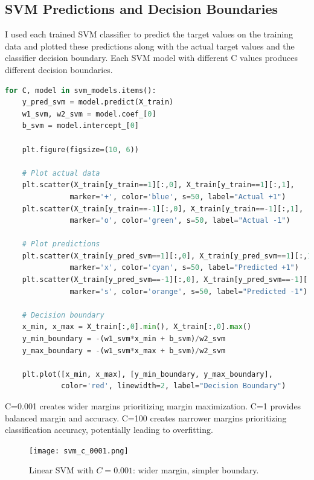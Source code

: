 \documentclass[12pt,a4paper]{article}
\begin{document}
\subsection{SVM Predictions and Decision Boundaries}

I used each trained SVM classifier to predict the target values on the training data and plotted these predictions along with the actual target values and the classifier decision boundary. Each SVM model with different C values produces different decision boundaries.

\begin{lstlisting}[language=Python, caption={SVM Predictions and Decision Boundaries}]
for C, model in svm_models.items():
    y_pred_svm = model.predict(X_train)
    w1_svm, w2_svm = model.coef_[0]
    b_svm = model.intercept_[0]
    
    plt.figure(figsize=(10, 6))
    
    # Plot actual data
    plt.scatter(X_train[y_train==1][:,0], X_train[y_train==1][:,1], 
               marker='+', color='blue', s=50, label="Actual +1")
    plt.scatter(X_train[y_train==-1][:,0], X_train[y_train==-1][:,1], 
               marker='o', color='green', s=50, label="Actual -1")
    
    # Plot predictions
    plt.scatter(X_train[y_pred_svm==1][:,0], X_train[y_pred_svm==1][:,1], 
               marker='x', color='cyan', s=50, label="Predicted +1")
    plt.scatter(X_train[y_pred_svm==-1][:,0], X_train[y_pred_svm==-1][:,1], 
               marker='s', color='orange', s=50, label="Predicted -1")
    
    # Decision boundary
    x_min, x_max = X_train[:,0].min(), X_train[:,0].max()
    y_min_boundary = -(w1_svm*x_min + b_svm)/w2_svm
    y_max_boundary = -(w1_svm*x_max + b_svm)/w2_svm
    
    plt.plot([x_min, x_max], [y_min_boundary, y_max_boundary], 
             color='red', linewidth=2, label="Decision Boundary")
\end{lstlisting}

C=0.001 creates wider margins prioritizing margin maximization. C=1 provides balanced margin and accuracy. C=100 creates narrower margins prioritizing classification accuracy, potentially leading to overfitting.

\begin{figure}[H]
    \centering
    \texttt{[image: svm\_c\_0001.png]}
    \caption{Linear SVM with \(C=0.001\): wider margin, simpler boundary.}
    \label{fig:svm_c_0001}
\end{figure}
\end{document}
